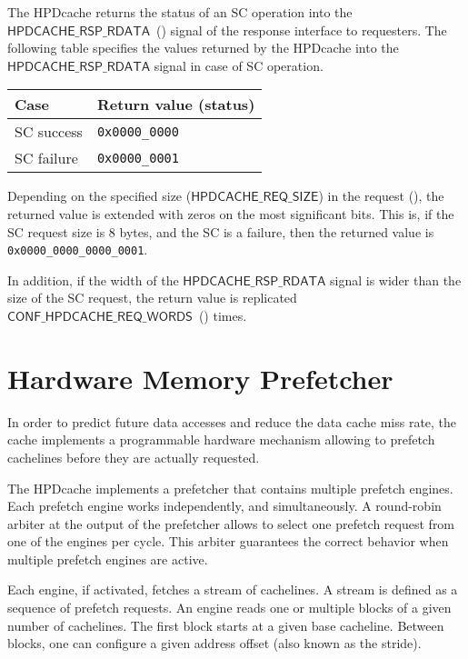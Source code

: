 \documentclass[10pt,titlepage,twoside]{book}
\begin{document}
The \ac{HPDcache} returns the status of an \ac{SC} operation into the $\mathsf{HPDCACHE\_RSP\_RDATA}$~() signal of the response interface to requesters.
The following table specifies the values returned by the \ac{HPDcache} into the $\mathsf{HPDCACHE\_RSP\_RDATA}$ signal in case of \ac{SC} operation.

\begin{center}
  {\small%
    \begin{tabular}{p{.15\linewidth}p{.20\linewidth}}
    \toprule
    \textbf{Case}
    & \textbf{Return value (status)}\\
    \midrule
    SC success
    & \texttt{0x0000\_0000} \\
    \midrule
    SC failure
    & \texttt{0x0000\_0001} \\
    \bottomrule
  \end{tabular}}
\end{center}

Depending on the specified size ($\mathsf{HPDCACHE\_REQ\_SIZE}$) in the request (), the returned value is extended with zeros on the most significant bits.
This is, if the SC request size is 8 bytes, and the SC is a failure, then the returned value is \texttt{0x0000\_0000\_0000\_0001}.

In addition, if the width of the $\mathsf{HPDCACHE\_RSP\_RDATA}$ signal is wider than the size of the SC request, the return value is replicated $\mathsf{CONF\_HPDCACHE\_REQ\_WORDS}$~() times.


\chapter{Hardware Memory Prefetcher}
\minitoc
\newpage

In order to predict future data accesses and reduce the data cache miss rate, the cache implements a programmable hardware mechanism allowing to prefetch cachelines before they are actually requested.

The \ac{HPDcache} implements a prefetcher that contains multiple prefetch engines.
Each prefetch engine works independently, and simultaneously.
A round-robin arbiter at the output of the prefetcher allows to select one prefetch request from one of the engines per cycle.
This arbiter guarantees the correct behavior when multiple prefetch engines are active.

Each engine, if activated, fetches a stream of cachelines.
A stream is defined as a sequence of prefetch requests.
An engine reads one or multiple blocks of a given number of cachelines.
The first block starts at a given base cacheline.
Between blocks, one can configure a given address offset (also known as the stride).
\end{document}

